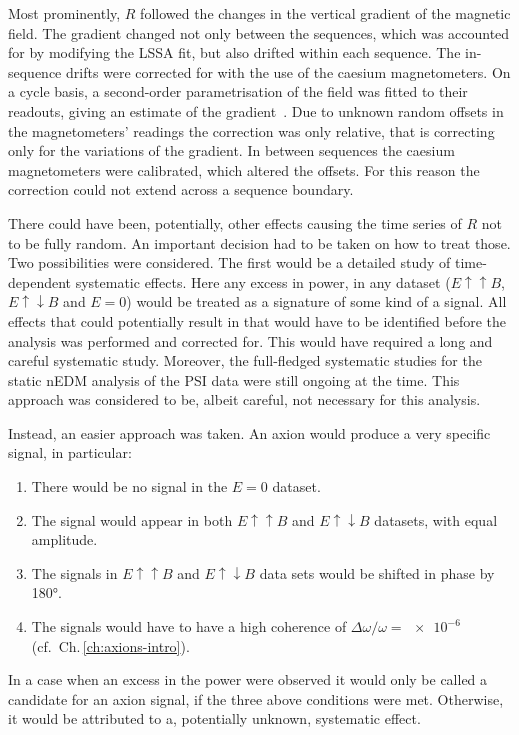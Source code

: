 Most prominently, $R$ followed the changes in the vertical gradient of the magnetic field.
The gradient changed not only between the sequences, which was accounted for by modifying the LSSA fit, but also drifted within each sequence.
The in-sequence drifts were corrected for with the use of the caesium magnetometers.
On a cycle basis, a second-order parametrisation of the field was fitted to their readouts, giving an estimate of the gradient~\cite{Afach2014magmoment,WurstenThesis}.
Due to unknown random offsets in the magnetometers' readings the correction was only relative, that is correcting only for the variations of the gradient.
In between sequences the caesium magnetometers were calibrated, which altered the offsets.
For this reason the correction could not extend across a sequence boundary.

There could have been, potentially, other effects causing the time series of $R$ not to be fully random.
An important decision had to be taken on how to treat those.
Two possibilities were considered.
The first would be a detailed study of time-dependent systematic effects.
Here any excess in power, in any dataset ($E \uparrow \uparrow B$, $E \uparrow \downarrow B$ and $E=0$) would be treated as a signature of some kind of a signal.
All effects that could potentially result in that would have to be identified before the analysis was performed and corrected for.
This would have required a long and careful systematic study.
Moreover, the full-fledged systematic studies for the static nEDM analysis of the PSI data were still ongoing at the time. This approach was considered to be, albeit careful, not necessary for this analysis.

Instead, an easier approach was taken. An axion would produce a very specific signal, in particular:
\begin{enumerate}
  \item There would be no signal in the $E=0$ dataset.
  \item The signal would appear in both $E \uparrow \uparrow B$ and $E \uparrow \downarrow B$ datasets, with equal amplitude.
  \item The signals in $E \uparrow \uparrow B$ and $E \uparrow \downarrow B$ data sets would be shifted in phase by \ang{180}.
  \item The signals would have to have a high coherence of $\Delta \omega / \omega = \num{e-6}$ (cf.\ Ch.\,\ref{ch:axions-intro}).
\end{enumerate}
In a case when an excess in the power were observed it would only be called a candidate for an axion signal, if the three above conditions were met.
Otherwise, it would be attributed to a, potentially unknown, systematic effect.

